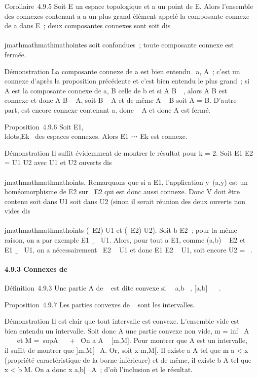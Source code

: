 Corollaire~4.9.5 Soit E un espace topologique et a un point de E. Alors
l'ensemble des connexes contenant a a un plus grand élément appelé la
composante connexe de a dans E~; deux composantes connexes sont soit
dis\\\\jmathmathmathmathointes soit confondues~; toute composante connexe est fermée.

Démonstration La composante connexe de a est bien entendu
\⋃  ~a\inA,
A\textconnexeA~; c'est un connexe d'après la
proposition précédente et c'est bien entendu le plus grand~; si A est la
composante connexe de a, B celle de b et si A \bigcap
B\neq~\varnothing~, alors A \cup B est connexe et donc A \cup B \subset~
A, soit B \subset~ A et de même A \subset~ B soit A = B. D'autre part,
\overlineA est encore connexe contenant a, donc
\overlineA \subset~ A et donc A est fermé.

Proposition~4.9.6 Soit
E1,\\ldots,Ek~
des espaces connexes. Alors E1 \times⋯ \times
Ek est connexe.

Démonstration Il suffit évidemment de montrer le résultat pour k = 2.
Soit E1 \times E2 = U1 \cup U2 avec
U1 et U2 ouverts dis\\\\jmathmathmathmathoints. Remarquons que si a \in
E1, l'application y\mapsto~(a,y) est un
homéomorphisme de E2 sur \a\
\times E2 qui est donc aussi connexe. Donc V doit être contenu soit
dans U1 soit dans U2 (sinon il serait réunion des
deux ouverts non vides dis\\\\jmathmathmathmathoints (\a\
\times E2) \bigcap U1 et (\a\
\times E2) \bigcap U2). Soit b \in E2~; pour la même
raison, on a par exemple E1
\times\b\ \subset~ U1. Alors, pour tout
a \in E1, comme (a,b) \in\a\ \times
E2 et E1 \times\b\ \subset~
U1, on a nécessairement \a\
\times E2 \subset~ U1 et donc E1 \times E2 \subset~
U1, soit encore U2 = \varnothing~.

\paragraph{4.9.3 Connexes de ~}

Définition~4.9.3 Une partie A de ~ est dite convexe si
\forall~~a,b \in {}~, {[}a,b{]} \subset~ ~.

Proposition~4.9.7 Les parties convexes de ~ sont les intervalles.

Démonstration Il est clair que tout intervalle est convexe. L'ensemble
vide est bien entendu un intervalle. Soit donc A une partie convexe non
vide, m = inf~ A \in \mathbb{R}~
\cup\-\infty~\ et M =\
supA \in {}~ \cup\ + \infty~\. On a A \subset~
{[}m,M{]}. Pour montrer que A est un intervalle, il suffit de montrer
que {]}m,M{[}\subset~ A. Or, soit x \in{]}m,M{[}. Il existe a \in A tel que m \leq a
\textless{} x (propriété caractéristique de la borne inférieure) et de
même, il existe b \in A tel que x \textless{} b \leq M. On a donc x
\in{]}a,b{[}\subset~ A~; d'où l'inclusion et le résultat.

